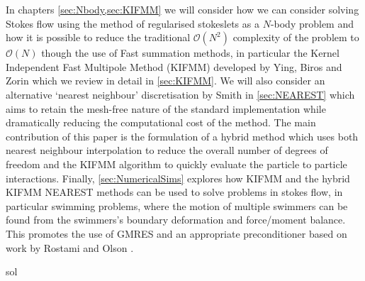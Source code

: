 In chapters \cref{sec:Nbody,sec:KIFMM} we will consider how we can consider solving Stokes flow using the method of regularised stokeslets as a $N$-body problem and how it is possible to reduce the traditional $\mathcal{O}(N^2)$ complexity of the problem to $\mathcal{O}(N)$ though the use of Fast summation methods, in particular the Kernel Independent Fast Multipole Method (KIFMM) developed by Ying, Biros and Zorin \cite{Ying2004} which we review in detail in \cref{sec:KIFMM}. We will also consider an alternative `nearest neighbour' discretisation by Smith \cite{Smith2018AEquation} in \cref{sec:NEAREST} which aims to retain the mesh-free nature  of the standard implementation while dramatically reducing the computational cost of the method. The main contribution of this paper is the formulation of a hybrid method which uses both nearest neighbour interpolation to reduce the overall number of degrees of freedom and the KIFMM algorithm to quickly evaluate the particle to particle interactions. Finally, \cref{sec:NumericalSims} explores how KIFMM and the hybrid KIFMM NEAREST methods can be used to solve problems in stokes flow, in particular swimming problems, where the motion of multiple swimmers can be found from the swimmers's boundary deformation and force/moment balance. This promotes the use of GMRES and an appropriate preconditioner based on work by Rostami and Olson \cite{Rostami2019FastBiofluids}.

sol